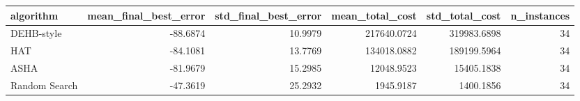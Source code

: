 \begin{tabular}{lrrrrr}
\toprule
algorithm & mean_final_best_error & std_final_best_error & mean_total_cost & std_total_cost & n_instances \\
\midrule
DEHB-style & -88.6874 & 10.9979 & 217640.0724 & 319983.6898 & 34 \\
HAT & -84.1081 & 13.7769 & 134018.0882 & 189199.5964 & 34 \\
ASHA & -81.9679 & 15.2985 & 12048.9523 & 15405.1838 & 34 \\
Random Search & -47.3619 & 25.2932 & 1945.9187 & 1400.1856 & 34 \\
\bottomrule
\end{tabular}

